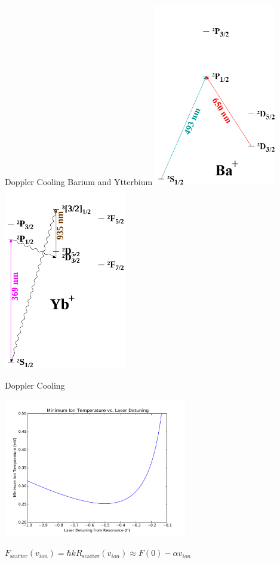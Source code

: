 \documentclass{beamer}
\begin{document}
\begin{frame}{Doppler Cooling Barium and Ytterbium}
	\centering
	\includegraphics[width=0.4\textwidth]{ionized-Ba-cooling}
	\hfill
	\includegraphics[width=0.4\textwidth]{ionized-Yb}
\end{frame}

\begin{frame}{Doppler Cooling}
	\centerline{\includegraphics[width=0.6\textwidth]{DopplerCooling}}
	\centerline{$F_\mathrm{scatter}( v_{ion} ) = \hbar k R_\mathrm{scatter}( v_{ion} ) \approx F(  0) - \alpha v_{ion}$}
\end{frame}
\end{document}
